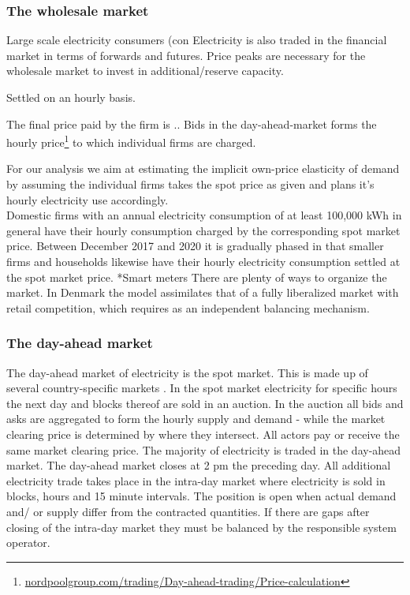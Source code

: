 \subsubsection{The wholesale market}
\label{subsubsec: t_whomarket}
Large scale electricity consumers (con
Electricity is also traded in the financial market in terms of forwards and futures. Price peaks are necessary for the wholesale market to invest in additional/reserve capacity. 

Settled on an hourly basis. 
 

The final price paid by the firm is .. 
Bids in the day-ahead-market forms the hourly price\footnote{\url{nordpoolgroup.com/trading/Day-ahead-trading/Price-calculation}} to which individual firms are charged. 

For our analysis we aim at estimating the implicit own-price elasticity of demand by assuming the individual firms takes the spot price as given and plans it's hourly electricity use accordingly.
\medskip\\
Domestic firms with an annual electricity consumption of at least 100,000 kWh in general have their hourly consumption charged by the corresponding spot market price. Between December 2017 and 2020 it is gradually phased in that
smaller firms and households likewise have their hourly electricity consumption settled at the spot market price.
*Smart meters
There are plenty of ways to organize the market. In Denmark the model assimilates that of a fully liberalized market with retail competition, which requires as an independent balancing mechanism. 

\subsubsection{The day-ahead market}
The day-ahead market of electricity is the spot market. This is made up of several country-specific markets . In the spot market electricity for specific hours the next day and blocks thereof are sold in an auction. In the auction all bids and asks are aggregated to form the hourly supply and demand - while the market clearing price is determined by where they intersect. All actors pay or receive the same market clearing price. The majority of electricity is traded in the day-ahead market. %
The day-ahead market closes at 2 pm the preceding day. All additional electricity trade takes place in the intra-day market where electricity is sold in blocks, hours and 15 minute intervals. The position is open when actual demand and/ or supply differ from the contracted quantities. If there are gaps after closing of the intra-day market they must be balanced by the responsible system operator.  



